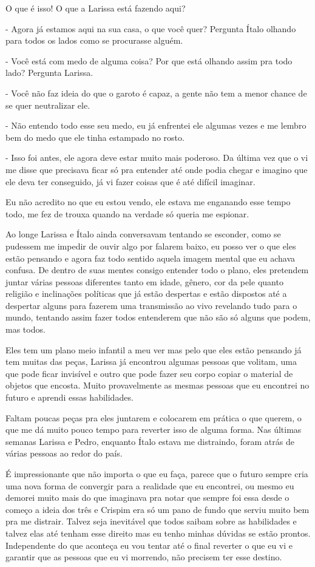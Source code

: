 O que é isso! O que a Larissa está fazendo aqui?

- Agora já estamos aqui na sua casa, o que você quer? Pergunta Ítalo olhando para todos os lados como se procurasse alguém.

- Você está com medo de alguma coisa? Por que está olhando assim pra todo lado? Pergunta Larissa.

- Você não faz ideia do que o garoto é capaz, a gente não tem a menor chance de se quer neutralizar ele.

- Não entendo todo esse seu medo, eu já enfrentei ele algumas vezes e me lembro bem do medo que ele tinha estampado no rosto.

- Isso foi antes, ele agora deve estar muito mais poderoso. Da última vez que o vi me disse que precisava ficar só pra entender até onde podia chegar e imagino que ele deva ter conseguido, já vi fazer coisas que é até difícil imaginar.

Eu não acredito no que eu estou vendo, ele estava me enganando esse tempo todo, me fez de trouxa quando na verdade só queria me espionar.

Ao longe Larissa e Ítalo ainda conversavam tentando se esconder, como se pudessem me impedir de ouvir algo por falarem baixo, eu posso ver o que eles estão pensando e agora faz todo sentido aquela imagem mental que eu achava confusa. De dentro de suas mentes consigo entender todo o plano, eles pretendem juntar várias pessoas diferentes tanto em idade, gênero, cor da pele quanto religião e inclinações políticas que já estão despertas e estão dispostos até a despertar alguns para fazerem uma transmissão ao vivo revelando tudo para o mundo, tentando assim fazer todos entenderem que não são só alguns que podem, mas todos.

Eles tem um plano meio infantil a meu ver mas pelo que eles estão pensando já tem muitas das peças, Larissa já encontrou algumas pessoas que volitam, uma que pode ficar invisível e outro que pode fazer seu corpo copiar o material de objetos que encosta. Muito provavelmente as mesmas pessoas que eu encontrei no futuro e aprendi essas habilidades.

Faltam poucas peças pra eles juntarem e colocarem em prática o que querem, o que me dá muito pouco tempo para reverter isso de alguma forma. Nas últimas semanas Larissa e Pedro, enquanto Ítalo estava me distraindo, foram atrás de várias pessoas ao redor do país.

É impressionante que não importa o que eu faça, parece que o futuro sempre cria uma nova forma de convergir para a realidade que eu encontrei, ou mesmo eu demorei muito mais do que imaginava pra notar que sempre foi essa desde o começo a ideia dos três e Crispim era só um pano de fundo que serviu muito bem pra me distrair. Talvez seja inevitável que todos saibam sobre as habilidades e talvez elas até tenham esse direito mas eu tenho minhas dúvidas se estão prontos. Independente do que aconteça eu vou tentar até o final reverter o que eu vi e garantir que as pessoas que eu vi morrendo, não precisem ter esse destino.

